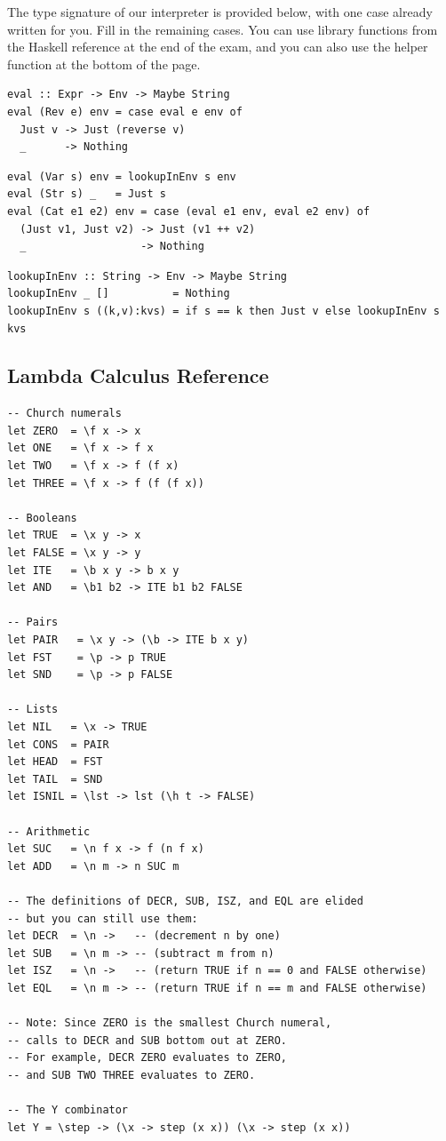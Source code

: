 \documentclass[addpoints]{exam}
\begin{document}
\begin{questions}
\question[20] The type signature of our interpreter is provided below, with one case already written for you.  Fill in the remaining cases.  You can use library functions from the Haskell reference at the end of the exam, and you can also use the helper function at the bottom of the page.

\begin{verbatim}
eval :: Expr -> Env -> Maybe String
eval (Rev e) env = case eval e env of
  Just v -> Just (reverse v)
  _      -> Nothing
\end{verbatim}
\begin{solutionorbox}[5in]

\begin{verbatim}
eval (Var s) env = lookupInEnv s env
eval (Str s) _   = Just s
eval (Cat e1 e2) env = case (eval e1 env, eval e2 env) of
  (Just v1, Just v2) -> Just (v1 ++ v2)
  _                  -> Nothing
\end{verbatim}
\end{solutionorbox}

\begin{verbatim}
lookupInEnv :: String -> Env -> Maybe String
lookupInEnv _ []          = Nothing
lookupInEnv s ((k,v):kvs) = if s == k then Just v else lookupInEnv s kvs
\end{verbatim}

\end{questions}

\newpage

\subsection*{Lambda Calculus Reference}

\begin{verbatim}
-- Church numerals
let ZERO  = \f x -> x
let ONE   = \f x -> f x
let TWO   = \f x -> f (f x)
let THREE = \f x -> f (f (f x))

-- Booleans
let TRUE  = \x y -> x
let FALSE = \x y -> y
let ITE   = \b x y -> b x y
let AND   = \b1 b2 -> ITE b1 b2 FALSE

-- Pairs
let PAIR   = \x y -> (\b -> ITE b x y)
let FST    = \p -> p TRUE
let SND    = \p -> p FALSE

-- Lists
let NIL   = \x -> TRUE
let CONS  = PAIR
let HEAD  = FST
let TAIL  = SND
let ISNIL = \lst -> lst (\h t -> FALSE)

-- Arithmetic
let SUC   = \n f x -> f (n f x)
let ADD   = \n m -> n SUC m

-- The definitions of DECR, SUB, ISZ, and EQL are elided
-- but you can still use them:
let DECR  = \n ->   -- (decrement n by one)
let SUB   = \n m -> -- (subtract m from n)
let ISZ   = \n ->   -- (return TRUE if n == 0 and FALSE otherwise)
let EQL   = \n m -> -- (return TRUE if n == m and FALSE otherwise)

-- Note: Since ZERO is the smallest Church numeral,
-- calls to DECR and SUB bottom out at ZERO.
-- For example, DECR ZERO evaluates to ZERO,
-- and SUB TWO THREE evaluates to ZERO.

-- The Y combinator
let Y = \step -> (\x -> step (x x)) (\x -> step (x x))
\end{verbatim}
\end{document}
